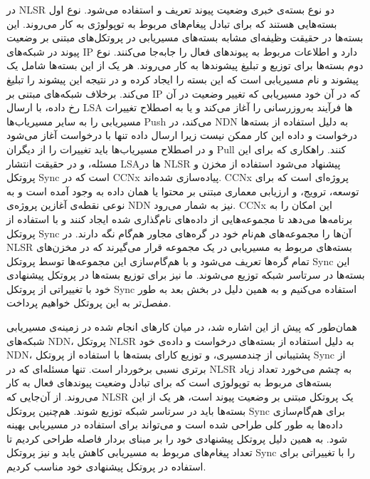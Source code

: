  در NLSR دو نوع بسته‌ی خبری وضعیت پیوند تعریف و استفاده می‌شود. نوع اول بسته‌هایی هستند که برای تبادل پیغام‌های مربوط به توپولوژی به کار می‌روند. این بسته‌ها در حقیقت وظیفه‌ای مشابه بسته‌های مسیریابی در پروتکل‌های مبتنی بر وضعیت پیوند در شبکه‌های IP دارد و اطلاعات مربوط به پبوند‌های فعال را جابه‌جا می‌کنند. نوع دوم بسته‌ها برای توزیع و تبلیغ پیشوند‌ها به کار می‌روند. هر یک از این بسته‌ها شامل یک پیشوند و نام مسیریابی است که این بسته را ایجاد کرده و در نتیجه این پیشوند را تبلیغ می‌کند. برخلاف شبکه‌های مبتنی بر IP که در آن خود مسیریابی که تغییر وضعیت در آن رخ داده، با ارسال LSA ها فرآیند به‌روزرسانی را آغاز می‌کند و یا به اصطلاح تغییرات مسیریابی را به سایر مسیریاب‌ها Push می‌کند، در NDN به دلیل استفاده از بسته‌ها درخواست و داده این کار ممکن نیست زیرا ارسال داده‌ تنها با درخواست آغاز می‌شود و در اصطلاح مسیریاب‌ها باید تغییرات را از دیگران Pull کنند. راهکاری که برای این مسئله، و در حقیقت انتشار LSAها در NLSR پیشنهاد می‌شود استفاده از مخزن  و پروتکل Sync است که در CCNx پیاده‌سازی شده‌اند. CCNx پروژه‌ای است که برای توسعه، ترویج، و ارزیابی معماری مبتنی بر محتوا یا همان داده به وجود آمده است و به نوعی نقطه‌ی آغازین پروژه‌ی NDN نیز به شمار می‌رود. CCNx این امکان را به برنامه‌ها می‌دهد تا مجموعه‌هایی از داده‌های نام‌گذاری شده ایجاد کنند و با استفاده از پروتکل Sync آن‌ها را مجموعه‌های هم‌نام خود در گره‌های مجاور هم‌گام نگه دارند. در NLSR بسته‌های مربوط به مسیریابی در یک مجموعه قرار می‌گیرند که در مخزن‌های تمام گره‌ها تعریف می‌شود و با هم‌گام‌سازی این مجموعه‌ها توسط پروتکل Sync این بسته‌ها در سرتاسر شبکه توزیع می‌شوند. ما نیز برای توزیع بسته‌ها در پروتکل پیشنهادی خود با تغییراتی از پروتکل Sync استفاده می‌کنیم و به همین دلیل در بخش بعد به طور مفصل‌تر به این پروتکل خواهیم پرداخت.

همان‌طور که پیش از این اشاره شد، در میان کارهای انجام شده در زمینه‌ی مسیریابی شبکه‌های NDN، پروتکل NLSR به دلیل استفاده از بسته‌های درخواست و داده‌ی خود NDN، پشتیبانی از چندمسیری، و توزیع کارای بسته‌ها با استفاده از پروتکل Sync از برتری نسبی برخوردار است. تنها مسئله‌ای که در NLSR به چشم می‌خورد تعداد زیاد بسته‌های مربوط به توپولوژی است که برای تبادل وضعیت پیوندهای فعال به کار می‌روند. از آن‌جایی که NLSR یک پروتکل مبتنی بر وضعیت پیوند است، هر یک از این بسته‌ها باید در سرتاسر شبکه توزیع شوند. هم‌چنین پروتکل Sync برای هم‌گام‌سازی داده‌ها به طور کلی طراحی شده است و می‌تواند برای استفاده در مسیریابی بهینه شود. به همین دلیل پروتکل پیشنهادی خود را بر مبنای بردار فاصله طراحی کردیم تا تعداد پیغام‌های مربوط به مسیریابی کاهش یابد و نیز پروتکل Sync  را با تغییراتی برای استفاده در پروتکل پیشنهادی خود مناسب کردیم. 




